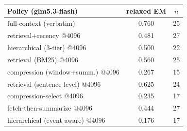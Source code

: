 \begin{tabular}{lcc}
\toprule
Policy (glm5.3-flash) & relaxed EM & $n$ \\
\midrule
full-context (verbatim) & 0.760 & 25 \\
retrieval+recency @4096 & 0.481 & 27 \\
hierarchical (3-tier) @4096 & 0.500 & 22 \\
retrieval (BM25) @4096 & 0.560 & 25 \\
compression (window+summ.) @4096 & 0.267 & 15 \\
retrieval (sentence-level) @4096 & 0.625 & 24 \\
compression-select @4096 & 0.235 & 17 \\
fetch-then-summarize @4096 & 0.444 & 27 \\
hierarchical (event-aware) @4096 & 0.176 & 17 \\
\bottomrule
\end{tabular}
